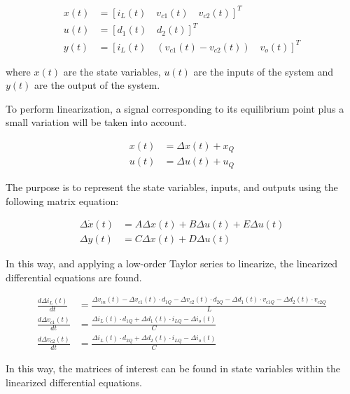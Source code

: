 \begin{align}
x(t) &= {[{i}_{L}(t)\quad{v}_{c1}(t)\quad{v}_{c2}(t)]}^{T} \nonumber\\
u(t) &= {[{d}_{1}(t)\quad{d}_{2}(t)]}^{T} \nonumber\\
y(t) &= {[{i}_{L}(t)\quad({v}_{c1}(t)-{v}_{c2}(t))\quad{v}_{o}(t)]}^{T} 
\end{align}

where $x(t)$ are the state variables, $u(t)$ are the inputs of the system and $y(t)$ are the output of the system.

To perform linearization, a signal corresponding to its equilibrium point plus a small variation will be taken into account.

\begin{align}
x(t) &= \Delta x(t)+ {x}_{Q} \nonumber\\
u(t) &= \Delta u(t)+ {u}_{Q}  
\end{align}

The purpose is to represent the state variables, inputs, and outputs using the following matrix equation:

\begin{align}
 \Delta\dot{x}(t)&= A\Delta x(t)+B\Delta u(t)+ E\Delta u(t)\\
\Delta y(t)&= C \Delta x(t)+D\Delta u(t) 
\end{align}

In this way, and applying a low-order Taylor series to linearize, the linearized differential equations are found.


\begin{align}
\frac{d\Delta{i}_{L}(t)}{dt}&=\frac{\Delta{v}_{in}(t)-\Delta{v}_{c1}(t)\cdot{d}_{1Q}-\Delta{v}_{c2}(t)\cdot{d}_{2Q}-\Delta{d}_{1}(t)\cdot{v}_{c1Q}-\Delta{d}_{2}(t)\cdot{v}_{c2Q}}{L} \\
\frac{d\Delta{v}_{c1}(t)}{dt}&=\frac{\Delta{i}_{L}(t)\cdot{d}_{1Q}+\Delta{d}_{1}(t)\cdot{i}_{LQ}-\Delta{i}_{o}(t)}{C} \\
\frac{d\Delta{v}_{c2}(t)}{dt}&=\frac{\Delta{i}_{L}(t)\cdot{d}_{2Q}+\Delta{d}_{2}(t)\cdot{i}_{LQ}-\Delta{i}_{o}(t)}{C}
\end{align}

In this way, the matrices of interest can be found in state variables within the linearized differential equations.

